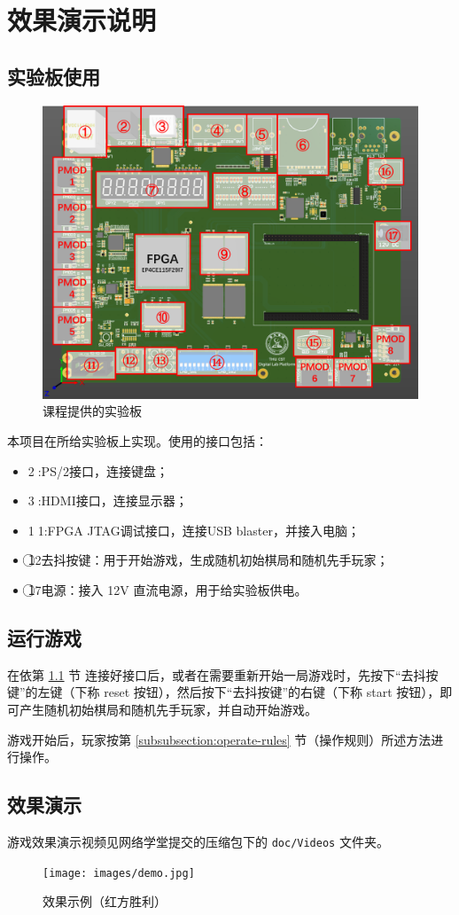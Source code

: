 \section{效果演示说明}

\subsection{实验板使用}\label{subsection:circuit-usage}
\begin{figure}[H]
    \centering
    \includegraphics[scale=0.50]{images/board_anno.png}
    \caption{课程提供的实验板}
    \label{fig:board_anno}
\end{figure}

本项目在所给实验板上实现。使用的接口包括：
\begin{itemize}
    \item \textcircled{2}:PS/2接口，连接键盘；
    \item \textcircled{3}:HDMI接口，连接显示器；
    \item \textcircled{11}:FPGA JTAG调试接口，连接USB blaster，并接入电脑；
    \item \textcircled{12}去抖按键：用于开始游戏，生成随机初始棋局和随机先手玩家；
    \item \textcircled{17}电源：接入 12V 直流电源，用于给实验板供电。
\end{itemize}

\subsection{运行游戏}
在依第 \ref{subsection:circuit-usage} 节 连接好接口后，或者在需要重新开始一局游戏时，先按下“去抖按键”的左键（下称 reset 按钮），然后按下“去抖按键”的右键（下称 start 按钮），即可产生随机初始棋局和随机先手玩家，并自动开始游戏。

游戏开始后，玩家按第 \ref{subsubsection:operate-rules} 节（操作规则）所述方法进行操作。

\subsection{效果演示}

游戏效果演示视频见网络学堂提交的压缩包下的 \verb|doc/Videos| 文件夹。
\begin{figure}[H]
    \centering
    \texttt{[image: images/demo.jpg]}
    \caption{效果示例（红方胜利）}
    \label{fig:demo}
\end{figure}